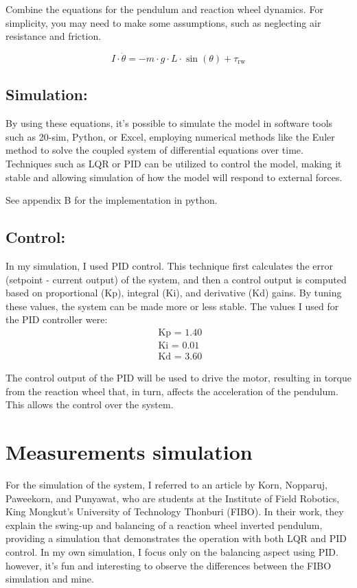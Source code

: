 \documentclass{article}
\begin{document}
\begin{multicols}{2}
Combine the equations for the pendulum and reaction wheel dynamics. For simplicity, you may need to make some assumptions, such as neglecting air resistance and friction.

\[
I \cdot \ddot{\theta} = -m \cdot g \cdot L \cdot \sin(\theta) + \tau_{\text{rw}}
\]

\subsection{Simulation:}

By using these equations, it's possible to simulate the model in software tools such as 20-sim, Python, or Excel, employing numerical methods like the Euler method to solve the coupled system of differential equations over time. Techniques such as LQR or PID can be utilized to control the model, making it stable and allowing simulation of how the model will respond to external forces.

See appendix B for the implementation in python.

\subsection{Control:}

In my simulation, I used PID control. 
This technique first calculates the error (setpoint - current output) of the system, and then a control output is computed based on proportional (Kp), integral (Ki), and derivative (Kd) gains. 
By tuning these values, the system can be made more or less stable.
The values I used for the PID controller were:
\begin{align*}
\text{ Kp = 1.40}\\
\text{ Ki = 0.01}\\
\text{ Kd = 3.60}
\end{align*}



The control output of the PID will be used to drive the motor, resulting in torque from the reaction wheel that, in turn, affects the acceleration of the pendulum. This allows the control over the system.


\section{Measurements simulation}
For the simulation of the system, I referred to an article by Korn, Nopparuj, Paweekorn, and Punyawat, who are students at the Institute of Field Robotics, King Mongkut’s University of Technology Thonburi (FIBO). In their work, they explain the swing-up and balancing of a reaction wheel inverted pendulum, providing a simulation that demonstrates the operation with both LQR and PID control. In my own simulation, I focus only on the balancing aspect using PID. however, it's fun and interesting to observe the differences between the FIBO simulation and mine.


\end{multicols}
\end{document}
